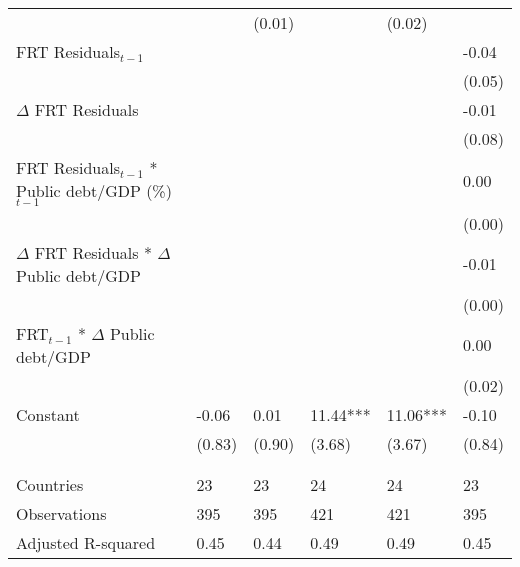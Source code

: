 \begin{tabular}{lp{3cm}p{3cm}p{3cm}p{3cm}p{3cm}}
   &  & (0.01) &  & (0.02) &  \\ 
  FRT Residuals$_{t-1}$ &  &  &  &  & -0.04 \\ 
   &  &  &  &  & (0.05) \\ 
  $\Delta$ FRT Residuals &  &  &  &  & -0.01 \\ 
   &  &  &  &  & (0.08) \\ 
  FRT Residuals$_{t-1}$ * Public debt/GDP (\%)$_{t-1}$ &  &  &  &  & 0.00 \\ 
   &  &  &  &  & (0.00) \\ 
  $\Delta$ FRT Residuals * $\Delta$ Public debt/GDP &  &  &  &  & -0.01 \\ 
   &  &  &  &  & (0.00) \\ 
  FRT$_{t-1}$ * $\Delta$ Public debt/GDP &  &  &  &  & 0.00 \\ 
   &  &  &  &  & (0.02) \\ 
  Constant & -0.06 & 0.01 & 11.44*** & 11.06*** & -0.10 \\ 
   & (0.83) & (0.90) & (3.68) & (3.67) & (0.84) \\ 
   &  &  &  &  &  \\ 
   &  &  &  &  &  \\ 
  Countries & 23 & 23 & 24 & 24 & 23 \\ 
  Observations & 395 & 395 & 421 & 421 & 395 \\ 
  Adjusted R-squared & 0.45 & 0.44 & 0.49 & 0.49 & 0.45 \\ 
   \hline
\end{tabular}
\endgroup
